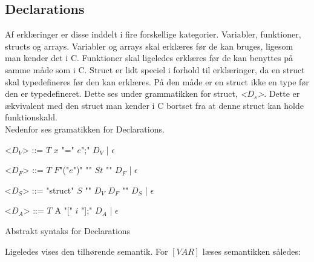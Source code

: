 \noindent \subsection{Declarations}
Af erklæringer er disse inddelt i fire forskellige kategorier. Variabler, funktioner, structs og arrays. 
Variabler og arrays skal erklæres før de kan bruges, ligesom man kender det i C. Funktioner skal ligeledes erklæres før de kan benyttes på samme måde som i C. Struct er lidt speciel i forhold til erklæringer, da en struct skal typedefineres før den kan erklæres. På den måde er en struct ikke en type før den er typedefineret. Dette ses under grammatikken for struct,  \textit{<$D_s$>}. Dette er ækvivalent med den struct man kender i C bortset fra at denne struct kan holde funktionskald.\\

\noindent Nedenfor ses gramatikken for Declarations.

\begin{Grammar}
 \begin{grammar}
 <$D_V$> ::= $T$ $x$ "=" $e$";" $D_V$ | $\epsilon$
 
 <$D_F$> ::= $T$ $F$"("$e$")" "{" $St$ "}" $D_F$ | $\epsilon$
 
 <$D_S$> ::= "struct" $S$ "{" $D_V$ $D_F$ "}" $D_S$ | $\epsilon$
 
 <$D_A$> ::= $T$ A "[" $i$ "];" $D_A$ | $\epsilon$
 \end{grammar}
 \caption{Abstrakt syntaks for Declarations}\label{gra:declarations}
\end{Grammar}

\noindent Ligeledes vises den tilhørende semantik. For $[VAR]$ læses semantikken således:
